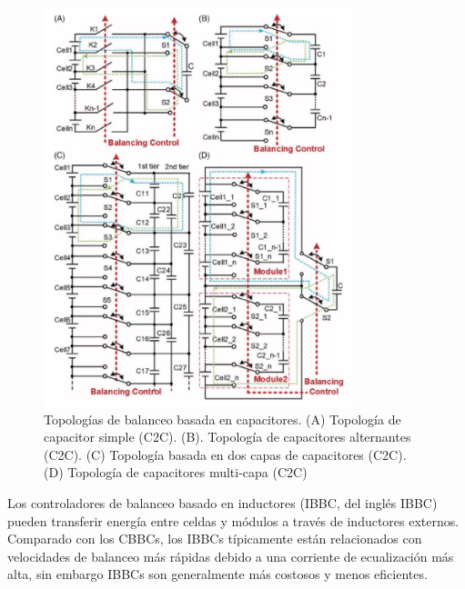\documentclass[10pt,a4paper]{article}
\newcounter{subsubsubsection}[subsubsection]
\begin{document}
\begin{figure}[h!]
    \begin{center}
        \includegraphics[width=0.8\textwidth]{cbbc_top.png}
        \caption{Topolog\'ias de balanceo basada en capacitores. (A) Topolog\'ia
        de capacitor simple (\acrshort{C2C}). (B). Topolog\'ia de capacitores
        alternantes (\acrshort{C2C}). (C) Topolog\'ia basada en dos capas de
        capacitores (\acrshort{C2C}). (D) Topolog\'ia de capacitores multi-capa
        (\acrshort{C2C})}
        \label{cbbc_top}
    \end{center}
\end{figure}



Los controladores de balanceo basado en inductores (\acrshort{IBBC}, del
ingl\'es \acrlong{IBBC}) pueden transferir energ\'ia entre celdas y m\'odulos a
trav\'es de inductores externos. Comparado con los \acrshort{CBBC}s, los
\acrshort{IBBC}s t\'ipicamente est\'an relacionados con velocidades de balanceo
m\'as r\'apidas debido a una corriente de ecualizaci\'on m\'as alta, sin embargo
\acrshort{IBBC}s son generalmente m\'as costosos y menos eficientes.
\end{document}

